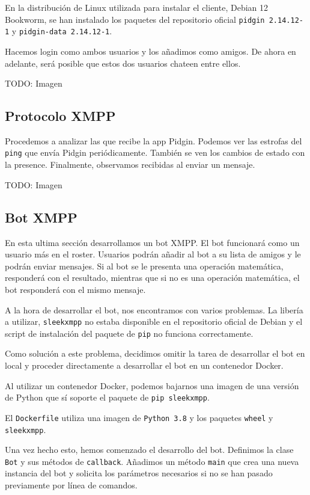 En la distribución de Linux utilizada para instalar el cliente, Debian 12 Bookworm,
se han instalado los paquetes del repositorio oficial 
\lstinline{pidgin 2.14.12-1} y \lstinline{pidgin-data 2.14.12-1}.

Hacemos login como ambos usuarios y los añadimos como amigos.
De ahora en adelante, será posible que estos dos usuarios chateen entre ellos.

TODO: Imagen

\subsection{Protocolo XMPP}

Procedemos a analizar las  que recibe la app Pidgin.
Podemos ver las estrofas del \lstinline{ping} que envía Pidgin periódicamente.
También se ven los cambios de estado con la  presence.
Finalmente, observamos  recibidas al enviar un mensaje.

TODO: Imagen

\subsection{Bot XMPP}

En esta ultima sección desarrollamos un bot XMPP.
El bot funcionará como un usuario más en el roster.
Usuarios podrán añadir al bot a su lista de amigos y le podrán enviar mensajes.
Si al bot se le presenta una operación matemática, responderá con el resultado,
mientras que si no es una operación matemática, el bot responderá con el mismo mensaje.

A la hora de desarrollar el bot, nos encontramos con varios problemas.
La libería a utilizar, \lstinline{sleekxmpp} no estaba disponible en el repositorio
oficial de Debian y el script de instalación del paquete de \lstinline{pip} no funciona correctamente.

Como solución a este problema, decidimos omitir la tarea de desarrollar el bot en local
y proceder directamente a desarrollar el bot en un contenedor Docker.

Al utilizar un contenedor Docker, podemos bajarnos una imagen de una versión de Python que sí soporte
el paquete de \lstinline{pip sleekxmpp}.

El \lstinline{Dockerfile} utiliza una imagen de \lstinline{Python 3.8}
y los paquetes \lstinline{wheel} y \lstinline{sleekxmpp}.

Una vez hecho esto, hemos comenzado el desarrollo del bot.
Definimos la clase \lstinline{Bot} y sus métodos de \lstinline{callback}.
Añadimos un método \lstinline{main} que crea una nueva instancia del bot
y solicita los parámetros necesarios si no se han pasado previamente
por línea de comandos.

